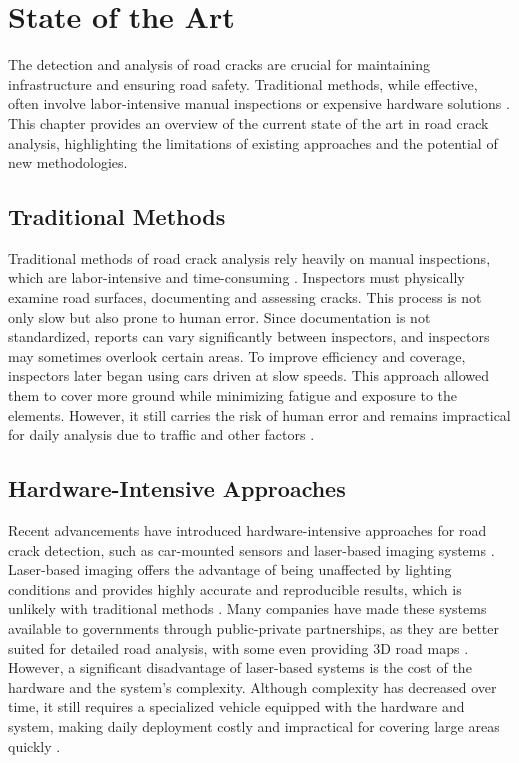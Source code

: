 \chapter{State of the Art}

The detection and analysis of road cracks are crucial for maintaining infrastructure and ensuring road safety. Traditional methods, while effective, often involve labor-intensive manual inspections or expensive hardware solutions \cite{pierece2024}. This chapter provides an overview of the current state of the art in road crack analysis, highlighting the limitations of existing approaches and the potential of new methodologies.

\section{Traditional Methods}

Traditional methods of road crack analysis rely heavily on manual inspections, which are labor-intensive and time-consuming \cite{pierece2024}. Inspectors must physically examine road surfaces, documenting and assessing cracks. This process is not only slow but also prone to human error. Since documentation is not standardized, reports can vary significantly between inspectors, and inspectors may sometimes overlook certain areas. To improve efficiency and coverage, inspectors later began using cars driven at slow speeds. This approach allowed them to cover more ground while minimizing fatigue and exposure to the elements. However, it still carries the risk of human error and remains impractical for daily analysis due to traffic and other factors \cite{pierece2024}.

\section{Hardware-Intensive Approaches}

Recent advancements have introduced hardware-intensive approaches for road crack detection, such as car-mounted sensors and laser-based imaging systems \cite{bmwpaper,yu2011}. Laser-based imaging offers the advantage of being unaffected by lighting conditions and provides highly accurate and reproducible results, which is unlikely with traditional methods \cite{yu2011}. Many companies have made these systems available to governments through public-private partnerships, as they are better suited for detailed road analysis, with some even providing 3D road maps \cite{yu2011,pierece2024}. However, a significant disadvantage of laser-based systems is the cost of the hardware and the system's complexity. Although complexity has decreased over time, it still requires a specialized vehicle equipped with the hardware and system, making daily deployment costly and impractical for covering large areas quickly \cite{yu2011}.

